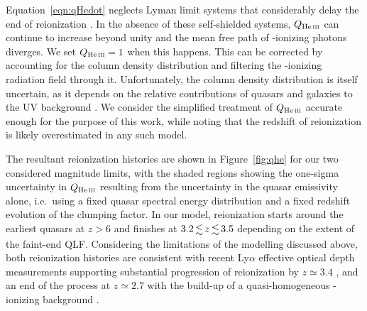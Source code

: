 \documentclass[fleqn,usenatbib]{mnras}
\begin{document}
Equation~\eqref{eqn:qHedot} neglects  Lyman limit systems
that considerably delay the end of  reionization
\citep{2009MNRAS.395..736B, 2017ApJ...851...50M}.  In the absence of
these self-shielded systems, $Q_\ion{He}{iii}$ can continue to
increase beyond unity and the mean free path of -ionizing
photons diverges.  We set $Q_\ion{He}{iii}=1$ when this happens.  This
can be corrected by accounting for the  column density
distribution and filtering the -ionizing radiation field
through it. Unfortunately, the  column density
distribution is itself uncertain, as it depends on the relative
contributions of quasars and galaxies to the UV background
\citep[e.g.][]{2012ApJ...746..125H,2018arXiv180104931P}.  We consider
the simplified treatment of $Q_\ion{He}{iii}$ accurate enough for the
purpose of this work, while noting that the redshift of 
reionization is likely overestimated in any such model.

The resultant  reionization histories are shown in
Figure~\ref{fig:qhe} for our two considered magnitude limits, with the
shaded regions showing the one-sigma uncertainty in $Q_\ion{He}{iii}$
resulting from the uncertainty in the quasar emissivity alone,
i.e.\ using a fixed quasar spectral energy distribution and a fixed
redshift evolution of the clumping factor.  In our model, 
reionization starts around the earliest quasars at $z>6$ and finishes
at $3.2\la z\la 3.5$ depending on the extent of the faint-end QLF.
Considering the limitations of the modelling discussed above, both
 reionization histories are consistent with recent
 Ly$\alpha$ effective optical depth measurements
supporting substantial progression of  reionization by
$z\simeq 3.4$ \citep{2016ApJ...825..144W}, and an end of the process
at $z\simeq 2.7$ \citep{2011ApJ...733L..24W,2016ApJ...825..144W} with
the build-up of a quasi-homogeneous -ionizing background
\citep{2014MNRAS.437.1141D,2017MNRAS.465.2886D}.
\end{document}
